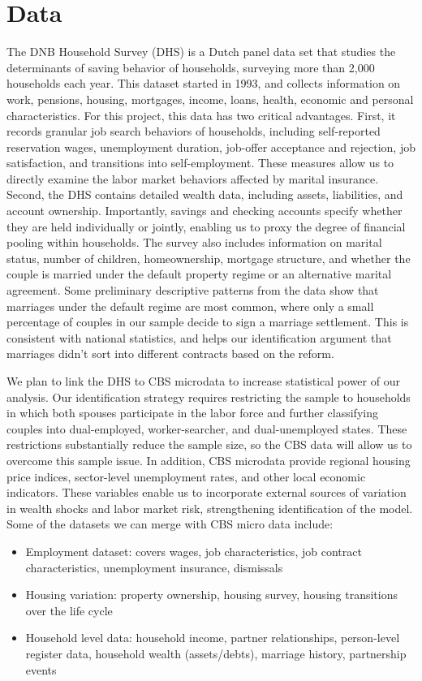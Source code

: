 \documentclass[11pt]{article}
\begin{document}
\section*{Data}
The DNB Household Survey (DHS) is a Dutch panel data set that studies the determinants of saving behavior of households, surveying more than 2,000 households each year. This dataset started in 1993, and collects information on work, pensions, housing, mortgages, income, loans, health, economic and personal characteristics.
For this project, this data has two critical advantages. First, it records granular job search behaviors of households, including self-reported reservation wages, unemployment duration, job-offer acceptance and rejection, job satisfaction, and transitions into self-employment. These measures allow us to directly examine the labor market behaviors affected by marital insurance. Second, the DHS contains detailed wealth data, including assets, liabilities, and account ownership. Importantly, savings and checking accounts specify whether they are held individually or jointly, enabling us to proxy the degree of financial pooling within households. The survey also includes information on marital status, number of children, homeownership, mortgage structure, and whether the couple is married under the default property regime or an alternative marital agreement. Some preliminary descriptive patterns from the data show that marriages under the default regime are most common, where only a small percentage of couples in our sample decide to sign a marriage settlement. This is consistent with national statistics, and helps our identification argument that marriages didn't sort into different contracts based on the reform. 

We plan to link the DHS to CBS microdata to increase statistical power of our analysis. Our identification strategy requires restricting the sample to households in which both spouses participate in the labor force and further classifying couples into dual-employed, worker-searcher, and dual-unemployed states. These restrictions substantially reduce the sample size, so the CBS data will allow us to overcome this sample issue. In addition, CBS microdata provide regional housing price indices, sector-level unemployment rates, and other local economic indicators. These variables enable us to incorporate external sources of variation in wealth shocks and labor market risk, strengthening identification of the model. Some of the datasets we can merge with CBS micro data include: 
\begin{itemize}
    \item Employment dataset: covers wages, job characteristics, job contract characteristics, unemployment insurance, dismissals
    \item Housing variation: property ownership, housing survey, housing transitions over the life cycle
    \item Household level data: household income, partner relationships, person-level register data,  household wealth (assets/debts), marriage history, partnership events
\end{itemize}
\end{document}
